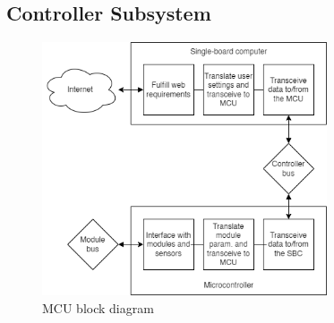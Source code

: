 \subsection{Controller Subsystem}
\begin{figure}[H]
    \caption{MCU block diagram}
    \centering
    \includegraphics[width=0.75\textwidth]{images/mcu_block_diagram.png}
\end{figure}